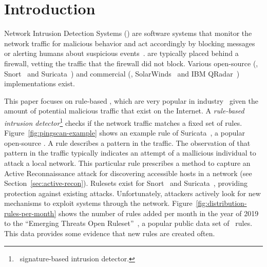 \documentclass[sigconf,review, anonymous]{acmart}
\begin{document}




\maketitle

\section{Introduction}
\label{sec:intro}

Network Intrusion Detection Systems (\nids{}) are software systems
that monitor the network traffic for malicious behavior and act
accordingly by blocking messages or alerting humans about suspicious
events~\cite{Mitchell:2014:SID:2597757.2542049}. \nids{} are typically
placed behind a firewall, vetting the traffic that the firewall did
not block. Various open-source (\eg{}, Snort~\cite{snort} and
Suricata~\cite{suricata}) and commercial (\eg{},
SolarWinds~\cite{solarwinds} and IBM QRadar~\cite{qradar})
implementations exist.

This paper focuses on rule-based \nids{}, which are very popular in
industry~\cite{proofpoint-etpro,snort-rule-subscriptions} given the
amount of potential malicious traffic that exist on the Internet. A
\emph{rule-based intrusion detector}\footnote{\aka\ signature-based
  intrusion detector.} checks if the network traffic matches a fixed
set of rules. Figure~\ref{fig:pingscan-example} shows an example rule
of Suricata~\cite{suricata}, a popular open-source \nids{}. A rule
describes a pattern in the traffic. The observation of that pattern in
the traffic typically indicates an attempt of a mallicious individual
to attack a local network. This particular rule prescribes a method to
capture an Active Reconnaissance attack for discovering accessible
hosts in a network (see Section~\ref{sec:active-recon}). Rulesets
exist for Snort~\cite{snort} and Suricata~\cite{suricata}, providing
protection against existing attacks. Unfortunately, attackers actively
look for new mechanisms to exploit systems through the
network. Figure~\ref{fig:distribution-rules-per-month} shows the
number of rules added per month in the year of 2019 to the ``Emerging
Threats Open Ruleset''~\cite{emerging-threats-open}, a popular public
data set of \suri\ rules. This data provides some evidence that new
rules are created often.
\end{document}
